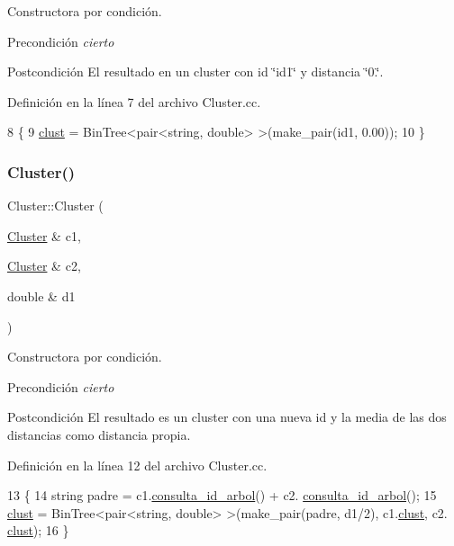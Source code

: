 Constructora por condición. 

\begin{DoxyPrecond}{Precondición}
{\itshape cierto} 
\end{DoxyPrecond}
\begin{DoxyPostcond}{Postcondición}
El resultado en un cluster con id \char`\"{}id1\char`\"{} y distancia \char`\"{}0.\char`\"{}. 
\end{DoxyPostcond}


Definición en la línea 7 del archivo Cluster.\+cc.


\begin{DoxyCode}
8 \{
9     \hyperlink{class_cluster_aaada1982eafeb072ce83cb6a3d5445e4}{clust} = BinTree<pair<string, double> >(make\_pair(id1, 0.00));
10 \}
\end{DoxyCode}
\mbox{\label{class_cluster_a7b6be460914bfb667992aa8858aaee57}} 
\subsubsection{\texorpdfstring{Cluster()}{Cluster()}\hspace{0.1cm}{\footnotesize\ttfamily [2/2]}}
{\footnotesize\ttfamily Cluster\+::\+Cluster (\begin{DoxyParamCaption}\item[{\hyperlink{class_cluster}{Cluster} \&}]{c1,  }\item[{\hyperlink{class_cluster}{Cluster} \&}]{c2,  }\item[{double \&}]{d1 }\end{DoxyParamCaption})}



Constructora por condición. 

\begin{DoxyPrecond}{Precondición}
{\itshape cierto} 
\end{DoxyPrecond}
\begin{DoxyPostcond}{Postcondición}
El resultado es un cluster con una nueva id y la media de las dos distancias como distancia propia. 
\end{DoxyPostcond}


Definición en la línea 12 del archivo Cluster.\+cc.


\begin{DoxyCode}
13 \{
14     \textcolor{keywordtype}{string} padre = c1.\hyperlink{class_cluster_a2e994baf889c15dbb0e6111070c08d5d}{consulta\_id\_arbol}() +  c2.
      \hyperlink{class_cluster_a2e994baf889c15dbb0e6111070c08d5d}{consulta\_id\_arbol}();
15     \hyperlink{class_cluster_aaada1982eafeb072ce83cb6a3d5445e4}{clust} = BinTree<pair<string, double> >(make\_pair(padre, d1/2), c1.\hyperlink{class_cluster_aaada1982eafeb072ce83cb6a3d5445e4}{clust}, c2.
      \hyperlink{class_cluster_aaada1982eafeb072ce83cb6a3d5445e4}{clust});
16 \}
\end{DoxyCode}


